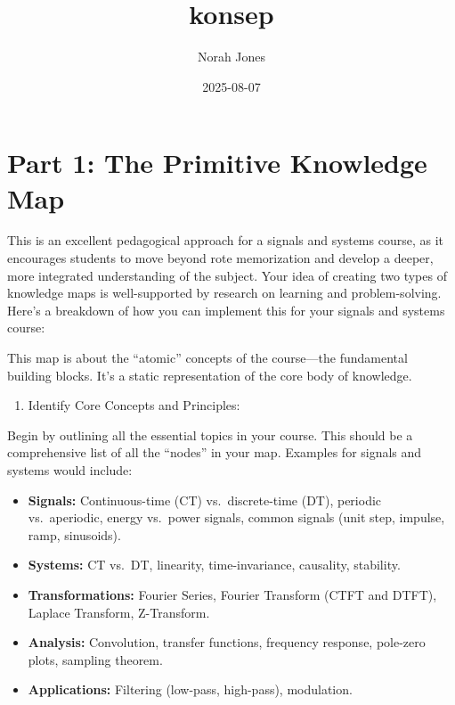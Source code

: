 \documentclass[
  letterpaper,
  DIV=11,
  numbers=noendperiod]{scrreprt}
\title{konsep}
\author{Norah Jones}
\date{2025-08-07}
\providecommand{\tightlist}{%
  \setlength{\itemsep}{0pt}\setlength{\parskip}{0pt}}\usepackage{longtable,booktabs,array}
\renewcommand*\contentsname{Table of contents}
\newcommand\contentsname{Table of contents}
\begin{document}
\maketitle

\renewcommand*\contentsname{Table of contents}
{
\hypersetup{linkcolor=}
\setcounter{tocdepth}{2}
\tableofcontents
}


\chapter{Part 1: The Primitive Knowledge
Map}\label{part-1-the-primitive-knowledge-map}

This is an excellent pedagogical approach for a signals and systems
course, as it encourages students to move beyond rote memorization and
develop a deeper, more integrated understanding of the subject. Your
idea of creating two types of knowledge maps is well-supported by
research on learning and problem-solving. Here's a breakdown of how you
can implement this for your signals and systems course:

This map is about the ``atomic'' concepts of the course---the
fundamental building blocks. It's a static representation of the core
body of knowledge.

\begin{enumerate}
\def\labelenumi{\arabic{enumi}.}
\tightlist
\item
  Identify Core Concepts and Principles:
\end{enumerate}

Begin by outlining all the essential topics in your course. This should
be a comprehensive list of all the ``nodes'' in your map. Examples for
signals and systems would include:

\begin{itemize}
\item
  \textbf{Signals:} Continuous-time (CT) vs.~discrete-time (DT),
  periodic vs.~aperiodic, energy vs.~power signals, common signals (unit
  step, impulse, ramp, sinusoids).
\item
  \textbf{Systems:} CT vs.~DT, linearity, time-invariance, causality,
  stability.
\item
  \textbf{Transformations:} Fourier Series, Fourier Transform (CTFT and
  DTFT), Laplace Transform, Z-Transform.
\item
  \textbf{Analysis:} Convolution, transfer functions, frequency
  response, pole-zero plots, sampling theorem.
\item
  \textbf{Applications:} Filtering (low-pass, high-pass), modulation.
\end{itemize}
\end{document}
